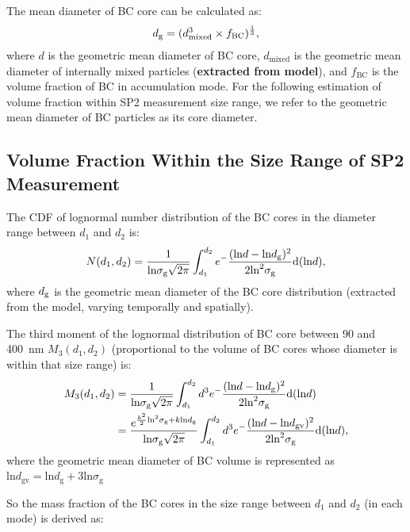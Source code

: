 \documentclass[12pt, fullpage]{uiucthesis2009}
\begin{document}
	The mean diameter of BC core can be calculated as:
	\begin{align*}
	d_{\rm g} = (d_{\text{mixed}}^3 \times f_{\text{BC}})^\frac{1}{3}, 
	\end{align*}
	where $d$ is the geometric mean diameter of BC core,
	$d_{\text{mixed}}$ is the geometric mean diameter of internally mixed particles
	(\textbf{extracted from model}), and $f_{\text{BC}}$ is the volume
	fraction of BC in accumulation mode. For the following estimation of volume fraction within SP2 measurement size range, we refer to the geometric mean diameter of BC particles as its core diameter.
	
	\subsection{Volume Fraction Within the Size Range of SP2 Measurement}
	The CDF of lognormal number distribution of the BC cores in the diameter range between $d_{1}$ and
	$d_{2}$ is:
	\begin{align*}
	N(d_{1}, d_{2}) = \frac{1}{\text{ln}\sigma_{\text{g}}\sqrt{2\pi}}\int_{d_{1}}^{d_{2}}e^-\frac{(\text{ln}d - \text{ln}d_{\rm g})^2}{2\text{ln}^2\sigma_{\text{g}}}\text{d}(\text{ln}d),
	\end{align*}
	where $d_{\rm g}$ is the geometric mean diameter of the BC core distribution (extracted from the model, varying temporally and spatially). 
	
	The third moment of the lognormal distribution of BC core between 90 and 400~nm $M_{3}(d_{1}, d_{2})$ (proportional to the volume of BC cores whose diameter is within that size range) is:
	\begin{align*}
	M_{3}(d_{1}, d_{2}) &= \frac{1}{\text{ln}\sigma_{\text{g}}\sqrt{2\pi}}\int_{d_{1}}^{d_{2}}d^3e^-\frac{(\text{ln}d - \text{ln}d_{\rm g})^2}{2\text{ln}^2\sigma_{\text{g}}}\text{d}(\text{ln}d)  \\
	&=\frac{e^{\frac{k^2}{2}\text{ln}^2\sigma_{\rm g}+k\text{ln}d_{\rm g}}}{\text{ln}\sigma_{\text{g}}\sqrt{2\pi}}\int_{d_{1}}^{d_{2}}d^3e^-\frac{(\text{ln}d - \text{ln}d_{\text{gv}})^2}{2\text{ln}^2\sigma_{\text{g}}}\text{d}(\text{ln}d),
	\end{align*}
	where the geometric mean diameter of BC volume is represented as $\text{ln}d_{\text{gv}}
	= \text{ln}d_{\text{g}} + 3\text{ln}\sigma_{\text{g}}$
	
	So the mass fraction of the BC cores in the size range between $d_{1}$ and $d_{2}$ (in each mode) is derived as:
	
\end{document}
